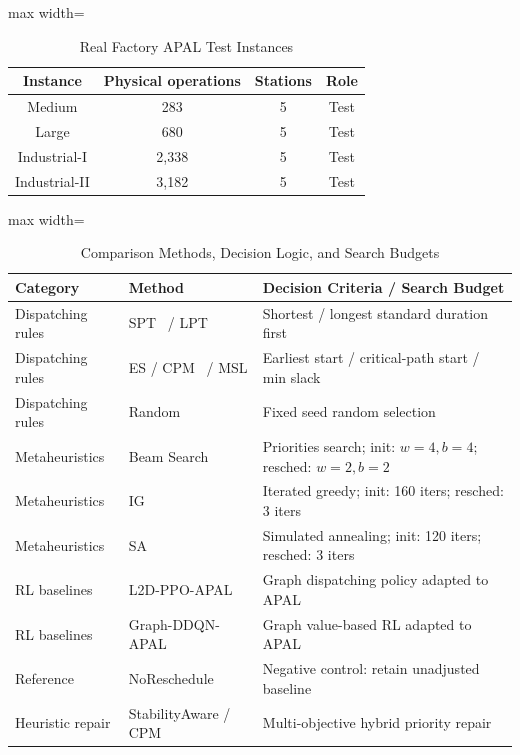 \documentclass[journal,10pt]{IEEEtran}
\renewcommand{\arraystretch}{1.04}
\begin{document}
\begin{table}[!t]
\centering
\caption{Real Factory APAL Test Instances}
\label{tab:instances}
\setlength{\tabcolsep}{6pt}
\renewcommand{\arraystretch}{0.98}
\begin{adjustbox}{max width=\columnwidth}
\begin{tabular}{@{}cccc@{}}
\toprule
\textbf{Instance} & \textbf{Physical operations} & \textbf{Stations} & \textbf{Role} \\
\midrule
Medium & 283 & 5 & Test \\
Large & 680 & 5 & Test \\
Industrial-I & 2,338 & 5 & Test \\
Industrial-II & 3,182 & 5 & Test \\
\bottomrule
\end{tabular}
\end{adjustbox}
\vspace{2pt}
\par{}\par
\end{table}

\begin{table}[!t]
\centering
\caption{Comparison Methods, Decision Logic, and Search Budgets}
\label{tab:baselines}
\setlength{\tabcolsep}{3pt}
\renewcommand{\arraystretch}{0.98}
\begin{adjustbox}{max width=\columnwidth}
\begin{tabular}{@{}lll@{}}
\toprule
\textbf{Category} & \textbf{Method} & \textbf{Decision Criteria / Search Budget} \\
\midrule
Dispatching rules & SPT~\cite{smith1956} / LPT & Shortest / longest standard duration first \\
Dispatching rules & ES / CPM~\cite{kelley1961} / MSL & Earliest start / critical-path start / min slack \\
Dispatching rules & Random & Fixed seed random selection \\
Metaheuristics & Beam Search~\cite{ow1988} & Priorities search; init: $w=4, b=4$; resched: $w=2, b=2$ \\
Metaheuristics & IG~\cite{ruiz2007} & Iterated greedy; init: 160 iters; resched: 3 iters \\
Metaheuristics & SA~\cite{kirkpatrick1983} & Simulated annealing; init: 120 iters; resched: 3 iters \\
RL baselines & L2D-PPO-APAL & Graph dispatching policy adapted to APAL \\
RL baselines & Graph-DDQN-APAL & Graph value-based RL adapted to APAL \\
Reference & NoReschedule & Negative control: retain unadjusted baseline \\
Heuristic repair & StabilityAware / CPM & Multi-objective hybrid priority repair \\
\bottomrule
\end{tabular}
\end{adjustbox}
\end{table}
\end{document}
